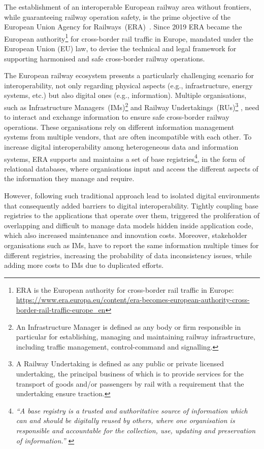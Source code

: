 The establishment of an interoperable
European railway area without frontiers,
while guaranteeing railway operation safety,
is the prime objective of the European Union Agency for Railways~(ERA)~\cite{eu-796-2016}.
Since 2019 ERA became the European authority\footnote{ERA is the European authority for cross-border rail traffic in Europe: \url{https://www.era.europa.eu/content/era-becomes-european-authority-cross-border-rail-traffic-europe_en}}
for cross-border rail traffic in Europe,
mandated under the European Union (EU) law,
to devise the technical and legal framework for supporting harmonised
and safe cross-border railway operations.

The European railway ecosystem
presents a particularly challenging scenario for interoperability,
not only regarding physical aspects (e.g., infrastructure, energy systems, etc.) but also digital ones (e.g., information).
Multiple organisations, such as Infrastructure Managers~(IMs)\footnote{An Infrastructure Manager is defined as any body or firm responsible in particular for establishing, managing and maintaining railway infrastructure, including traffic management, control-command and signalling.}
and Railway Undertakings~(RUs)\footnote{A Railway Undertaking is defined as any public or private licensed undertaking, the principal business of which is to provide services for the transport of goods and/or passengers by rail with a requirement that the undertaking ensure traction.} \cite{eu-34-2012},
need to interact and exchange information to ensure safe cross-border railway operations.
These organisations rely on different information management systems
from multiple vendors, that are often incompatible with each other.
To increase digital interoperability
among heterogeneous data and information systems,
ERA supports and maintains a set of base registries\footnote{ \textit{``A base registry is  a  trusted  and  authoritative  source  of  information  which  can  and  should be digitally reused by others, where one organisation is responsible and accountable  for  the  collection,  use,  updating  and  preservation  of  information.''} \cite{eu-iop}},
in the form of relational databases,
where organisations input and access
the different aspects of the information they manage and require.

However, following such traditional approach
lead to isolated digital environments
that consequently added barriers to digital interoperability.
Tightly coupling base registries to the applications that operate over them,
triggered the proliferation of overlapping
and difficult to manage data models hidden inside application code,
which also increased maintenance and innovation costs.
Moreover, stakeholder organisations such as IMs,
have to report the same information multiple times for different registries,
increasing the probability of data inconsistency issues,
while adding more costs to IMs due to duplicated efforts.

